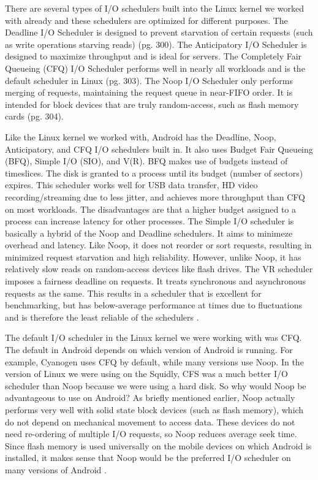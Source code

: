 \documentclass[letterpaper,10pt,titlepage]{article}
\newcommand{\tab}{\hspace*{2em}} %
\begin{document}
\tab There are several types of I/O schedulers built into the Linux kernel we worked with already and these schedulers are optimized for different purposes. The Deadline I/O Scheduler is designed to prevent starvation of certain requests (such as write operations starving reads) \cite{Love}(pg. 300). The Anticipatory I/O Scheduler is designed to maximize throughput and is ideal for servers. The Completely Fair Queueing (CFQ) I/O Scheduler performs well in nearly all workloads and is the default scheduler in Linux \cite{Love}(pg. 303). The Noop I/O Scheduler only performs merging of requests, maintaining the request queue in near-FIFO order. It is intended for block devices that are truly random-access, such as flash memory cards \cite{Love}(pg. 304).

\tab Like the Linux kernel we worked with, Android has the Deadline, Noop, Anticipatory, and CFQ I/O schedulers built in. It also uses Budget Fair Queueing (BFQ), Simple I/O (SIO), and V(R). BFQ makes use of budgets instead of timeslices. The disk is granted to a process until its budget (number of sectors) expires. This scheduler works well for USB data transfer, HD video recording/streaming due to less jitter, and achieves more throughput than CFQ on most workloads. The disadvantages are that a higher budget assigned to a process can increase latency for other processes. The Simple I/O scheduler is basically a hybrid of the Noop and Deadline schedulers. It aims to minimeze overhead and latency. Like Noop, it does not reorder or sort requests, resulting in minimized request starvation and high reliability. However, unlike Noop, it has relatively slow reads on random-access devices like flash drives. The VR scheduler imposes a fairness deadline on requests. It treats synchronous and asynchronous requests as the same. This results in a scheduler that is excellent for benchmarking, but has below-average performance at times due to fluctuations and is therefore the least reliable of the schedulers \cite{zhanjia}.

\tab The default I/O scheduler in the Linux kernel we were working with was CFQ. The default in Android depends on which version of Android is running. For example, Cyanogen uses CFQ by default, while many versions use Noop. In the version of Linux we were using on the Squidly, CFS was a much better I/O scheduler than Noop because we were using a hard disk. So why would Noop be advantageous to use on Android? As briefly mentioned earlier, Noop actually performs very well with solid state block devices (such as flash memory), which do not depend on mechanical movement to access data. These devices do not need re-ordering of multiple I/O requests, so Noop reduces average seek time. Since flash memory is used universally on the mobile devices on which Android is installed, it makes sense that Noop would be the preferred I/O scheduler on many versions of Android \cite{farmatito}.
\end{document}
